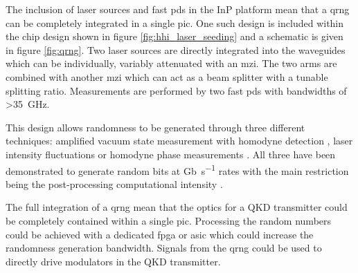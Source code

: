 

The inclusion of laser sources and fast \acp{pd} in the \ac{InP} platform mean that a \ac{qrng} can be completely integrated in a single \ac{pic}. One such design is included within the chip design shown in figure \ref{fig:hhi_laser_seeding} and a schematic is given in figure \ref{fig:qrng}. Two laser sources are directly integrated into the waveguides which can be individually, variably attenuated with an \ac{mzi}. The two arms are combined with another \ac{mzi} which can act as a beam splitter with a tunable splitting ratio. Measurements are performed by two fast \acp{pd} with bandwidths of \SI{>35}{GHz}. 

This design allows randomness to be generated through three different techniques: amplified vacuum state measurement with homodyne detection \cite{gabriel2010generator, zheng20196}, laser intensity fluctuations \cite{raffaelli2018generation} or homodyne phase measurements \cite{xu2012ultrafast}. All three have been demonstrated to generate random bits at \si{Gb\per\second} rates with the main restriction being the post-processing computational intensity \cite{Herrero-Collantes2017Quantum}.





The full integration of a \ac{qrng} mean that the optics for a \ac{QKD} transmitter could be completely contained within a single \ac{pic}. Processing the random numbers could be achieved with a dedicated \ac{fpga} or \ac{asic} which could increase the randomness generation bandwidth. Signals from the \ac{qrng} could be used to directly drive modulators in the \ac{QKD} transmitter.

